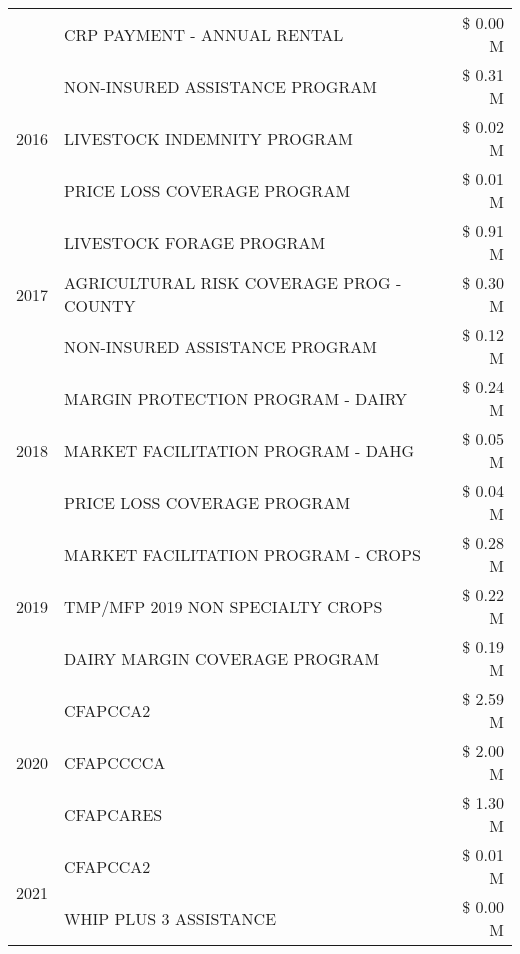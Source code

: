 \begin{tabular}{llr}
 & CRP PAYMENT - ANNUAL RENTAL & \$ 0.00 M \\
\cline{1-3}
\multirow[t]{3}{*}{2016} & NON-INSURED ASSISTANCE PROGRAM & \$ 0.31 M \\
 & LIVESTOCK INDEMNITY PROGRAM & \$ 0.02 M \\
 & PRICE LOSS COVERAGE PROGRAM & \$ 0.01 M \\
\cline{1-3}
\multirow[t]{3}{*}{2017} & LIVESTOCK FORAGE PROGRAM & \$ 0.91 M \\
 & AGRICULTURAL RISK COVERAGE PROG - COUNTY & \$ 0.30 M \\
 & NON-INSURED ASSISTANCE PROGRAM & \$ 0.12 M \\
\cline{1-3}
\multirow[t]{3}{*}{2018} & MARGIN PROTECTION PROGRAM - DAIRY & \$ 0.24 M \\
 & MARKET FACILITATION PROGRAM - DAHG & \$ 0.05 M \\
 & PRICE LOSS COVERAGE PROGRAM & \$ 0.04 M \\
\cline{1-3}
\multirow[t]{3}{*}{2019} & MARKET FACILITATION PROGRAM - CROPS & \$ 0.28 M \\
 & TMP/MFP 2019 NON SPECIALTY CROPS & \$ 0.22 M \\
 & DAIRY MARGIN COVERAGE PROGRAM & \$ 0.19 M \\
\cline{1-3}
\multirow[t]{3}{*}{2020} & CFAPCCA2 & \$ 2.59 M \\
 & CFAPCCCCA & \$ 2.00 M \\
 & CFAPCARES & \$ 1.30 M \\
\cline{1-3}
\multirow[t]{2}{*}{2021} & CFAPCCA2 & \$ 0.01 M \\
 & WHIP PLUS 3 ASSISTANCE & \$ 0.00 M \\
\cline{1-3}
\bottomrule
\end{tabular}
